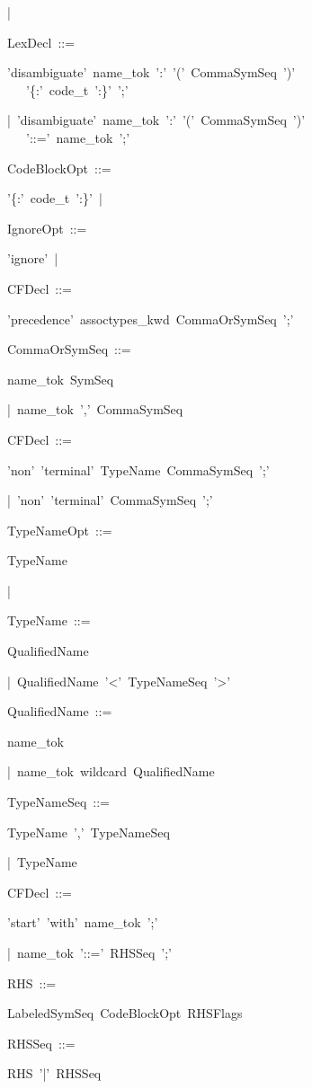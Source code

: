 \documentclass[12pt,english,twoside]{report}
\newenvironment{codeblock}
{\begin{list}{}{
\setlength{\rightmargin}{\leftmargin}
\setlength{\listparindent}{0pt}%
\raggedright
\setlength{\itemsep}{0pt}
\setlength{\parsep}{0pt}
\normalfont\ttfamily}%
 \item[]}
{\end{list}}
\begin{document}
\begin{codeblock}
\begin{codeblock}
|~
\end{codeblock}
LexDecl~::=
\begin{codeblock}
'disambiguate'~name\_tok~':'~'('~CommaSymSeq~')'~\\
~~~'\{:'~code\_t~':\}'~';'

|~'disambiguate'~name\_tok~':'~'('~CommaSymSeq~')'~\\
~~~'::='~name\_tok~';'
\end{codeblock}
CodeBlockOpt~::=
\begin{codeblock}
'\{:'~code\_t~':\}'~|~
\end{codeblock}
IgnoreOpt~::=
\begin{codeblock}
'ignore'~|~
\end{codeblock}
CFDecl~::=
\begin{codeblock}
'precedence'~assoctypes\_kwd~CommaOrSymSeq~';'
\end{codeblock}
CommaOrSymSeq~::=
\begin{codeblock}
name\_tok~SymSeq

|~name\_tok~','~CommaSymSeq
\end{codeblock}
CFDecl~::=
\begin{codeblock}
'non'~'terminal'~TypeName~CommaSymSeq~';'

|~'non'~'terminal'~CommaSymSeq~';'
\end{codeblock}
TypeNameOpt~::=
\begin{codeblock}
TypeName

|~
\end{codeblock}
TypeName~::=
\begin{codeblock}
QualifiedName

|~QualifiedName~'<'~TypeNameSeq~'>'
\end{codeblock}
QualifiedName~::=
\begin{codeblock}
name\_tok

|~name\_tok~wildcard~QualifiedName
\end{codeblock}
TypeNameSeq~::=
\begin{codeblock}
TypeName~','~TypeNameSeq

|~TypeName
\end{codeblock}
CFDecl~::=
\begin{codeblock}
'start'~'with'~name\_tok~';'

|~name\_tok~'::='~RHSSeq~';'
\end{codeblock}
RHS~::=
\begin{codeblock}
LabeledSymSeq~CodeBlockOpt~RHSFlags
\end{codeblock}
RHSSeq~::=
\begin{codeblock}
RHS~'|'~RHSSeq


\end{codeblock}
\end{codeblock}
\end{document}
